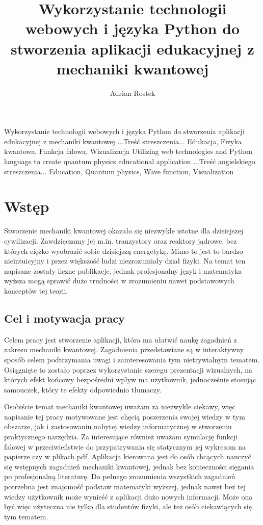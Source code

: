 \documentclass{SGGW-thesis}
\title{Wykorzystanie technologii webowych i języka Python do stworzenia aplikacji edukacyjnej z mechaniki kwantowej}
\author{Adrian Rostek}
\begin{document}
\maketitle
\statementpage
\abstractpage
{Wykorzystanie technologii webowych i języka Python do stworzenia aplikacji edukacyjnej z mechaniki kwantowej}
{...Treść streszczenia...}
{Edukacja, Fizyka kwantowa, Funkcja falowa, Wizualizacja}
{Utilizing web technologies and Python language to create quantum physics educational application}
{...Treść angielskiego streszczenia...}
{Education, Quantum physics, Wave function, Visualization}


{
  \doublespacing
  \tableofcontents
}

\startchapterfromoddpage %

\chapter{Wstęp}
Stworzenie mechaniki kwantowej okazało się niezwykle istotne dla dzisiejszej cywilizacji. Zawdzięczamy jej m.in. tranzystory oraz reaktory jądrowe, bez których ciężko wyobrazić sobie dzisiejszą energetykę\cite{nuclear-stats}. Mimo to jest to bardzo nieintuicyjny i przez większość ludzi niezrozumiały dział fizyki\cite{fiz atom}. Na temat ten napisane zostały liczne publikacje\cite{fiz atom}\cite{mechanika kwant}\cite{fiz kwant}, jednak profesjonalny język i matematyka wyższa mogą sprawić dużo trudności w zrozumieniu nawet podstawowych konceptów tej teorii.

	\section{Cel i motywacja pracy}
	Celem pracy jest stworzenie aplikacji, która ma ułatwić naukę zagadnień z zakresu mechaniki kwantowej. Zagadnienia przedstawiane są w interaktywny sposób celem podtrzymania uwagi i zainteresowania tym nietrywialnym tematem. Osiągnięte to zostało poprzez wykorzystanie szeregu prezentacji wizualnych, na których efekt końcowy bezpośredni wpływ ma użytkownik, jednocześnie stosując samouczek, który te efekty odpowiednio tłumaczy.
	
	Osobiście temat mechaniki kwantowej uważam za niezwykle ciekawy, więc napisanie tej pracy motywowane jest chęcią poszerzenia swojej wiedzy w tym obszarze, jak i zastosowaniu nabytej wiedzy informatycznej w stworzeniu praktycznego narzędzia. Za interesujące również uważam symulację funkcji falowej w przeciwieństwie do przypatrywania się statycznym jej wykresom na papierze czy w plikach pdf. Aplikacja kierowana jest do osób chcących nauczyć się wstępnych zagadnień mechaniki kwantowej, jednak bez konieczności sięgania po profesjonalną literaturę. Do pełnego zrozumienia wszystkich zagadnień potrzebna jest znajomość podstaw matematyki wyższej, jednak nawet bez tej wiedzy użytkownik może wynieść z aplikacji dużo nowych informacji. Może ona być więc użyteczna nie tylko dla studentów fizyki, ale też osób ciekawiących się tym tematem.
\end{document}
